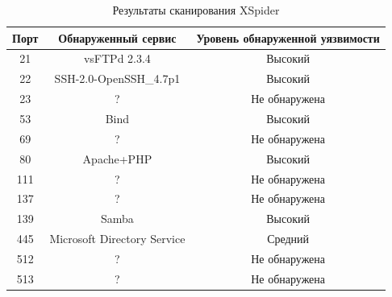 \begin{table}[H]
	\centering
	\caption{Результаты сканирования XSpider}
	\begin{tabular}{ccc}
		\hline
		\multicolumn{1}{|c|}{Порт}  & \multicolumn{1}{c|}{Обнаруженный сервис}         & \multicolumn{1}{c|}{Уровень обнаруженной уязвимости} \\ \hline
		\multicolumn{1}{|c|}{21}    & \multicolumn{1}{c|}{vsFTPd 2.3.4}                & \multicolumn{1}{c|}{Высокий}                         \\ \hline
		\multicolumn{1}{|c|}{22}    & \multicolumn{1}{c|}{SSH-2.0-OpenSSH\_4.7p1}      & \multicolumn{1}{c|}{Высокий}                         \\ \hline
		\multicolumn{1}{|c|}{23}    & \multicolumn{1}{c|}{?}                           & \multicolumn{1}{c|}{Не обнаружена}                   \\ \hline
		\multicolumn{1}{|c|}{53}    & \multicolumn{1}{c|}{Bind}                        & \multicolumn{1}{c|}{Высокий}                         \\ \hline
		\multicolumn{1}{|c|}{69}    & \multicolumn{1}{c|}{?}                           & \multicolumn{1}{c|}{Не обнаружена}                   \\ \hline
		\multicolumn{1}{|c|}{80}    & \multicolumn{1}{c|}{Apache+PHP}                  & \multicolumn{1}{c|}{Высокий}                         \\ \hline
		\multicolumn{1}{|c|}{111}   & \multicolumn{1}{c|}{?}                           & \multicolumn{1}{c|}{Не обнаружена}                   \\ \hline
		\multicolumn{1}{|c|}{137}   & \multicolumn{1}{c|}{?}                           & \multicolumn{1}{c|}{Не обнаружена}                   \\ \hline
		\multicolumn{1}{|c|}{139}   & \multicolumn{1}{c|}{Samba}                       & \multicolumn{1}{c|}{Высокий}                         \\ \hline
		\multicolumn{1}{|c|}{445}   & \multicolumn{1}{c|}{Microsoft Directory Service} & \multicolumn{1}{c|}{Средний}                         \\ \hline
		\multicolumn{1}{|c|}{512}   & \multicolumn{1}{c|}{?}                           & \multicolumn{1}{c|}{Не обнаружена}                   \\ \hline
		\multicolumn{1}{|c|}{513}   & \multicolumn{1}{c|}{?}                           & \multicolumn{1}{c|}{Не обнаружена}                   \\ \hline

\end{tabular}
\end{table}
